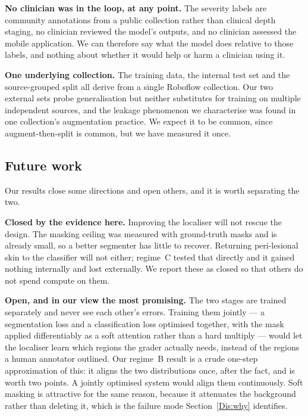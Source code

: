 \documentclass{melba}
\begin{document}
\textbf{No clinician was in the loop, at any point.} The severity labels are community annotations from a public collection rather than clinical depth staging, no clinician reviewed the model's outputs, and no clinician assessed the mobile application. We can therefore say what the model does relative to those labels, and nothing about whether it would help or harm a clinician using it.

\textbf{One underlying collection.} The training data, the internal test set and the source-grouped split all derive from a single Roboflow collection. Our two external sets probe generalisation but neither substitutes for training on multiple independent sources, and the leakage phenomenon we characterise was found in one collection's augmentation practice. We expect it to be common, since augment-then-split is common, but we have measured it once.

\subsection{Future work}
\label{Dis:future}
Our results close some directions and open others, and it is worth separating the two.

\textbf{Closed by the evidence here.} Improving the localiser will not rescue the design. The masking ceiling was measured with ground-truth masks and is already small, so a better segmenter has little to recover. Returning peri-lesional skin to the classifier will not either; regime~C tested that directly and it gained nothing internally and lost externally. We report these as closed so that others do not spend compute on them.

\textbf{Open, and in our view the most promising.} The two stages are trained separately and never see each other's errors. Training them jointly --- a segmentation loss and a classification loss optimised together, with the mask applied differentiably as a soft attention rather than a hard multiply --- would let the localiser learn which regions the grader actually needs, instead of the regions a human annotator outlined. Our regime~B result is a crude one-step approximation of this: it aligns the two distributions once, after the fact, and is worth two points. A jointly optimised system would align them continuously. Soft masking is attractive for the same reason, because it attenuates the background rather than deleting it, which is the failure mode Section~\ref{Dis:why} identifies.
\end{document}
